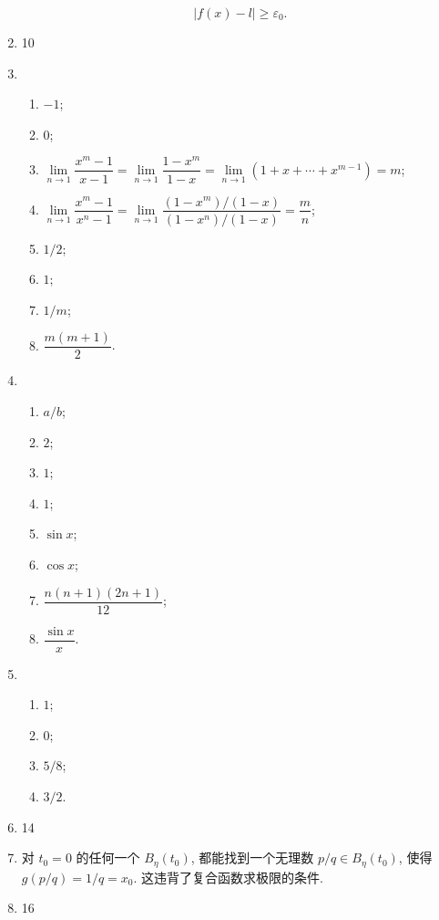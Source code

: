 \begin{enumerate}
        \[
            |f(x) - l| \geqslant \varepsilon_0.
        \]
    \item 10
    \item %
        \begin{enumerate}[(1)]
            \item %
                $-1$;
            \item %
                $0$;
            \item %
                $\lim\limits_{n\to1}\dfrac{x^m-1}{x-1} = \lim\limits_{n\to1}\dfrac{1-x^m}{1-x} = \lim\limits_{n\to1}(1 + x + \cdots + x^{m-1}) = m$;
            \item %
                $\lim\limits_{n\to1}\dfrac{x^m-1}{x^n-1} = \lim\limits_{n\to1}\dfrac{(1-x^m)/(1-x)}{(1-x^n)/(1-x)} = \dfrac mn$;
            \item %
                $1/2$;
            \item %
                $1$;
            \item %
                $1/m$;
            \item %
                $\dfrac{m(m+1)}{2}$.
        \end{enumerate}
    \item %
        \begin{enumerate}[(1)]
            \item %
                $a/b$;
            \item %
                $2$;
            \item %
                $1$;
            \item %
                $1$;
            \item %
                $\sin x$;
            \item %
                $\cos x$;
            \item %
                $\dfrac{n(n+1)(2n+1)}{12}$;
            \item %
                $\dfrac{\sin x}{x}$.
        \end{enumerate}
    \item %
        \begin{enumerate}[(1)]
            \item %
                $1$;
            \item %
                $0$;
            \item %
                $5/8$;
            \item %
                $3/2$.
        \end{enumerate}
    \item 14
    \item %
        对 $t_0 = 0$ 的任何一个 $B_\eta(t_0)$, 都能找到一个无理数 $p/q \in B_\eta(t_0)$, 使得 $g(p/q) = 1/q = x_0$. 这违背了复合函数求极限的条件.
    \item 16
\end{enumerate}

% 